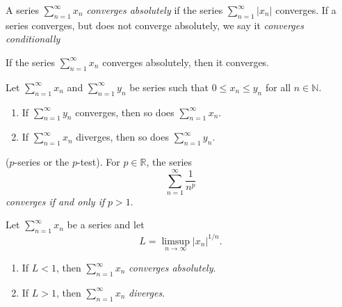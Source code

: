\documentclass[../main.tex]{subfiles}
\begin{document}
    
    
    
    
    \begin{definition}\label{def:absolute_Convergence_series}
    A series $\sum_{n=1}^{\infty} x_n$ \textit{converges absolutely} if the series $\sum_{n=1}^{\infty} |x_n|$ converges. If a series converges, but does not converge absolutely, we say it \textit{converges conditionally}
    \end{definition}
    
    
    
    
    \begin{proposition}
    If the series $\sum_{n=1}^{\infty} x_n$ converges absolutely, then it converges.
    \end{proposition}
    
    
    
    
    
    \begin{proposition}\label{prp:comparison_test_series}
    Let $\sum_{n=1}^{\infty} x_n$ and $\sum_{n=1}^{\infty} y_n$ be series such that $0 \leq x_n \leq y_n$ for all $n \in \mathbb{N}$.
    \begin{enumerate}
        \item If $\sum_{n=1}^{\infty} y_n$ converges, then so does $\sum_{n=1}^{\infty} x_n$.
        \item If $\sum_{n=1}^{\infty} x_n$ diverges, then so does $\sum_{n=1}^{\infty} y_n$.
    \end{enumerate}
    \end{proposition}
    
    
    
    
    
    
    \begin{proposition}[P-Series]\label{prp:p-series}
    ($p$-series or the $p$-test). For $p \in \mathbb{R}$, the series
    \[
    \sum_{n=1}^{\infty} \frac{1}{n^p}
    \]
    \textit{converges if and only if} $p > 1$.
    
    \end{proposition}
    
    
    
    
    
    
    
    
    \begin{proposition}\label{prp:root_test}
    Let $\sum_{n=1}^{\infty} x_n$ be a series and let
    \[
    L = \limsup_{n \to \infty} |x_n|^{1/n}.
    \]
    \begin{enumerate}
        \item If $L < 1$, then $\sum_{n=1}^{\infty} x_n$ \textit{converges absolutely}.
        \item If $L > 1$, then $\sum_{n=1}^{\infty} x_n$ \textit{diverges}.
    \end{enumerate}
    \end{proposition}
    
\end{document}
